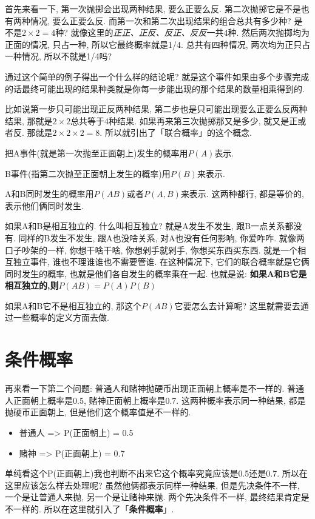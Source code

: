 首先来看一下, 第一次抛掷会出现两种结果, 要么正要么反. 第二次抛掷它是不是也有两种情况, 要么正要么反. 而第一次和第二次出现结果的组合总共有多少种? 是不是$2 \times 2 = 4$种? 就像这里的\textit{正正、正反、反正、反反}一共4种. 然后两次抛掷均为正面的情况, 只占一种, 所以它最终概率就是1/4. 总共有四种情况, 两次均为正只占一种情况, 所以不就是1/4吗? 

通过这个简单的例子得出一个什么样的结论呢? 就是这个事件如果由多个步骤完成的话最终可能出现的结果种类就是你每一步能出现的那个结果的数量相乘得到的. 

比如说第一步只可能出现正反两种结果, 第二步也是只可能出现要么正要么反两种结果, 那就是$2\times 2$总共等于4种结果. 如果再来第三次抛掷那又是多少, 就又是正或者反. 那就是$2\times 2\times 2=8$. 所以就引出了「联合概率」的这个概念. 

把A事件(就是第一次抛至正面朝上)发生的概率用$P(A)$表示. 

B事件(指第二次抛至正面朝上发生的概率)用$P(B)$来表示. 

A和B同时发生的概率用$P(AB)$或者$P(A,B)$来表示. 这两种都行, 都是等价的, 表示他们俩同时发生. 

如果A和B是相互独立的. 什么叫相互独立? 就是A发生不发生, 跟B一点关系都没有. 同样的B发生不发生, 跟A也没啥关系, 对A也没有任何影响, 你爱咋咋. 就像两口子吵架的一样, 你想干啥干啥, 你想剁手就剁手, 你想买东西买东西. 就是一个相互独立事件, 谁也不理谁谁也不需要管谁. 在这种情况下, 它们的联合概率就是它俩同时发生的概率, 也就是他们各自发生的概率乘在一起. 也就是说: \textbf{如果A和B它是相互独立的,则$P(AB) = P(A)P(B)$}

如果A和B它不是相互独立的, 那这个$P(AB)$它要怎么去计算呢? 这里就需要去通过一些概率的定义方面去做. 

\section{条件概率}

再来看一下第二个问题: 普通人和赌神抛硬币出现正面朝上概率是不一样的. 普通人正面朝上概率是0.5, 赌神正面朝上概率是0.7. 这两种概率表示同一种结果, 都是抛硬币正面朝上, 但是他们这个概率值是不一样的. 

\begin{itemize}
  \item 普通人 => P(正面朝上) = 0.5 
  \item 赌神 => P(正面朝上) = 0.7
\end{itemize}

单纯看这个P(正面朝上)我也判断不出来它这个概率究竟应该是0.5还是0.7. 所以在这里应该怎么样去处理呢? 虽然他俩都表示同样一种结果, 但是先决条件不一样, 一个是让普通人来抛, 另一个是让赌神来抛. 两个先决条件不一样, 最终结果肯定是不一样的. 所以在这里就引入了「\textbf{条件概率}」. 

